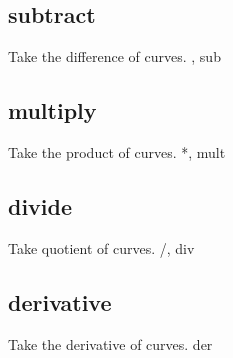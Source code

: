 \documentclass[letterpaper,10pt,english]{sphinxmanual}
\begin{document}
\begin{sphinxVerbatim}[commandchars=\\\{\}]
\PYG{p}{[}\PYG{p}{]}   
\end{sphinxVerbatim}


\subsection{subtract}
\label{\detokenize{math_operations:subtract}}
Take the difference of curves.  \textendash{}, sub

\begin{sphinxVerbatim}[commandchars=\\\{\}]
\PYG{p}{[}\PYG{p}{]}  
\end{sphinxVerbatim}


\subsection{multiply}
\label{\detokenize{math_operations:multiply}}
Take the product of curves.  *, mult

\begin{sphinxVerbatim}[commandchars=\\\{\}]
\PYG{p}{[}\PYG{p}{]}  
\end{sphinxVerbatim}


\subsection{divide}
\label{\detokenize{math_operations:divide}}
Take quotient of curves.  /, div

\begin{sphinxVerbatim}[commandchars=\\\{\}]
\PYG{p}{[}\PYG{p}{]}  
\end{sphinxVerbatim}


\subsection{derivative}
\label{\detokenize{math_operations:derivative}}
Take the derivative of curves.  der
\end{document}
